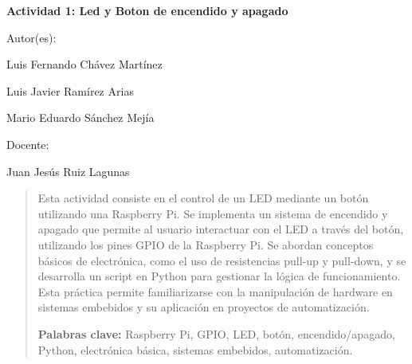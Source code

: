 \begin{center}
	\vspace*{2cm}
	
	\Large\textbf{Actividad 1: Led y Boton de encendido y apagado}
	
	\vspace{1.5cm}
	
	Autor(es):
	
	\vspace{0.5cm}
	
	Luis Fernando Chávez Martínez
	
	Luis Javier Ramírez Arias
	
	Mario Eduardo Sánchez Mejía
	
	
	\vspace{1.5cm}
	
	Docente:
	
	\vspace{0.5cm}
	
	
	Juan Jesús Ruiz Lagunas
	
	\vspace{0.5cm}
	
	\begin{abstract}
		\noindent
		\justifying
		Esta actividad consiste en el control de un LED mediante un botón utilizando una Raspberry Pi. Se implementa un sistema de encendido y apagado que permite al usuario interactuar con el LED a través del botón, utilizando los pines GPIO de la Raspberry Pi. Se abordan conceptos básicos de electrónica, como el uso de resistencias pull-up y pull-down, y se desarrolla un script en Python para gestionar la lógica de funcionamiento. Esta práctica permite familiarizarse con la manipulación de hardware en sistemas embebidos y su aplicación en proyectos de automatización.
		
		\vspace{0.5cm}
		\noindent
		\textbf{Palabras clave:} Raspberry Pi, GPIO, LED, botón, encendido/apagado, Python, electrónica básica, sistemas embebidos, automatización.
	\end{abstract}
\end{center}

\clearpage
{}